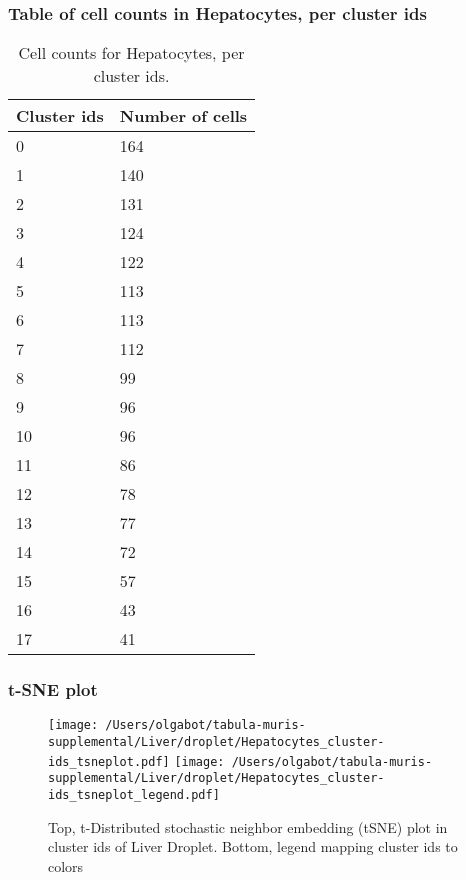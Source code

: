 \subsubsection{Table of cell counts in Hepatocytes, per cluster ids}\begin{table}[h]
\centering
\label{my-label}
\begin{tabular}{@{}ll@{}}
\toprule

Cluster ids& Number of cells \\ \midrule
0 & 164 \\

1 & 140 \\

2 & 131 \\

3 & 124 \\

4 & 122 \\

5 & 113 \\

6 & 113 \\

7 & 112 \\

8 & 99 \\

9 & 96 \\

10 & 96 \\

11 & 86 \\

12 & 78 \\

13 & 77 \\

14 & 72 \\

15 & 57 \\

16 & 43 \\

17 & 41 \\
\bottomrule
\end{tabular}
\caption{Cell counts for Hepatocytes, per cluster ids.}
\end{table}

\clearpage
\subsubsection{t-SNE plot}
\begin{figure}[h]
\centering
\texttt{[image: /Users/olgabot/tabula-muris-supplemental/Liver/droplet/Hepatocytes\_cluster-ids\_tsneplot.pdf]}
\texttt{[image: /Users/olgabot/tabula-muris-supplemental/Liver/droplet/Hepatocytes\_cluster-ids\_tsneplot\_legend.pdf]}
\caption{Top, t-Distributed stochastic neighbor embedding (tSNE) plot  in cluster ids of Liver Droplet. Bottom, legend mapping cluster ids to colors}
\end{figure}


